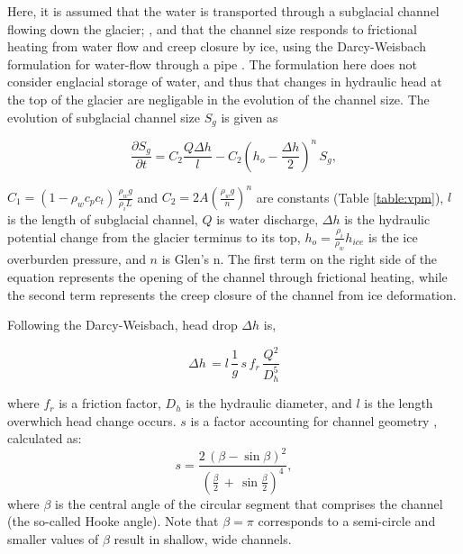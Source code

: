 \documentclass[11pt]{article}
\begin{document}
Here, it is assumed that the water is transported through a subglacial channel flowing down the glacier; \citep[Figure~\ref{fig:cartoon}; ][]{rothlisberger1972}, and that the channel  size responds to frictional heating from water flow and creep closure by ice, using the Darcy-Weisbach formulation for water-flow through a pipe  \citep[e.g.][]{rothlisberger1972,clarke2003}.
The formulation here does not consider englacial storage of water, and thus that changes in hydraulic head at the top of the glacier are negligable in the evolution of the channel size. 
The evolution of subglacial channel size $S_g$ is given as
\begin{linenomath*}
  \begin{equation}
    \label{eq:dS_dt}
    \frac{\partial S_g}{\partial t} = C_2 \frac{Q \Delta h}{l} - C_2 (h_{o}-\frac{\Delta h}{2})^n\,S_g,
  \end{equation}
\end{linenomath*}
\noindent $C_1= (1-\rho_wc_pc_t)\,\frac{\rho_wg}{\rho_iL}$ and $C_2=2A(\frac{\rho_wg}{n})^n$ are constants (Table \ref{table:vpm}), $l$ is the length of subglacial channel, $Q$ is water discharge, $\Delta h$ is the hydraulic potential change from the glacier terminus to its top, $h_{o}= \frac{\rho_i}{\rho_w} h_{ice}$ is the ice overburden pressure, and $n$ is Glen's n.
The first term on the right side of the equation represents the opening of the channel through frictional heating, while the second term represents the creep closure of the channel from ice deformation. 


Following the Darcy-Weisbach, head drop $\Delta h$ is,
\begin{linenomath*}
  \begin{equation}
    \label{eq:dh}
    \Delta h \,  = l \,\frac{1}{g}\,s\,f_r\,\frac{Q^2}{D_h^5}
  \end{equation}
\end{linenomath*}
\noindent where $f_r$ is a friction factor, $D_h$ is the hydraulic diameter, and $l$ is the length overwhich head change occurs. $s$ is a factor accounting for channel geometry \citep{hooke1990}, calculated as:
\begin{equation}
  \label{eq:Hf}
  s = \frac{2\,(\beta -\sin \beta)^2}{(\frac{\beta}{2}\,+\,\sin \frac{\beta}{2})^4},
\end{equation}
where $\beta$ is the central angle of the circular segment that comprises the channel (the so-called Hooke angle). Note that $\beta =\pi$ corresponds to a semi-circle and
smaller values of $\beta$ result in shallow, wide channels.
\end{document}
